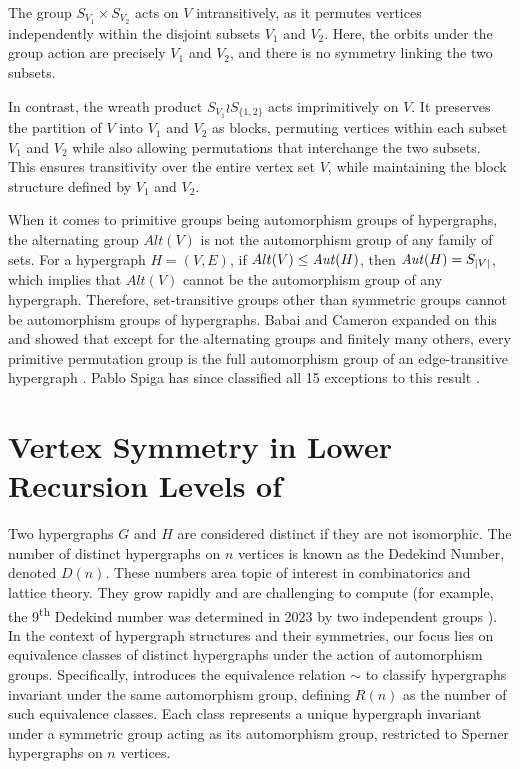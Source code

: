 The group $S_{V_1}\times S_{V_2}$ acts on $V$ intransitively, as it permutes vertices independently within the disjoint subsets $V_1$ and $V_2$. Here, the orbits under the group action are precisely $V_1$ and $V_2$, and there is no symmetry linking the two subsets.

In contrast, the wreath product $S_{V_1}\wr S_{\{1,2\}}$ acts imprimitively on $V$. It preserves the partition of $V$ into $V_1$ and $V_2$ as blocks, permuting vertices within each subset $V_1$ and $V_2$ while also allowing permutations that interchange the two subsets. This ensures transitivity over the entire vertex set $V$, while maintaining the block structure defined by $V_1$ and $V_2$.

When it comes to primitive groups being automorphism groups of hypergraphs, the alternating group $Alt(V)$ is not the automorphism group of any family of sets. For a hypergraph $H=(V,E)$, if $Alt(V)\leq\mathit{Aut}(H)$, then $\mathit{Aut}(H)=S_{|V|}$, which implies that $Alt(V)$ cannot be the automorphism group of any hypergraph. Therefore, set-transitive groups other than symmetric groups cannot be automorphism groups of hypergraphs. Babai and Cameron expanded on this and showed that except for the alternating groups and finitely many others, every primitive permutation group is the full automorphism group of an edge-transitive hypergraph \cite{BC15}. Pablo Spiga has since classified all 15 exceptions to this result \cite{Spi16}.

\section{Vertex Symmetry in Lower Recursion Levels of \FKA}

Two hypergraphs $G$ and $H$ are considered distinct if they are not isomorphic. The number of distinct hypergraphs on $n$ vertices is known as the Dedekind Number, denoted $D(n)$. These numbers area topic of interest in combinatorics and lattice theory. They grow rapidly and are challenging to compute (for example, the 9\textsuperscript{th} Dedekind number was determined in 2023 by two independent groups \cite{Cro23}). In the context of hypergraph structures and their symmetries, our focus lies on equivalence classes of distinct hypergraphs under the action of automorphism groups. Specifically, \cite{SY14} introduces the equivalence relation $\sim$ to classify hypergraphs invariant under the same automorphism group, defining $R(n)$ as the number of such equivalence classes. Each class represents a unique hypergraph invariant under a symmetric group acting as its automorphism group, restricted to Sperner hypergraphs on $n$ vertices.


